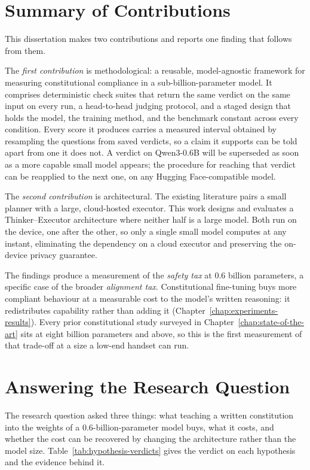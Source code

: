 \section{Summary of Contributions}
\label{sec:conclusion-contributions}

This dissertation makes two contributions and reports one finding that follows from them.

The \emph{first contribution} is methodological: a reusable, model-agnostic framework for measuring constitutional compliance in a sub-billion-parameter model. It comprises deterministic check suites that return the same verdict on the same input on every run, a head-to-head judging protocol, and a staged design that holds the model, the training method, and the benchmark constant across every condition. Every score it produces carries a measured interval obtained by resampling the questions from saved verdicts, so a claim it supports can be told apart from one it does not. A verdict on Qwen3-0.6B will be superseded as soon as a more capable small model appears; the procedure for reaching that verdict can be reapplied to the next one, on any Hugging Face-compatible model.

The \emph{second contribution} is architectural. The existing literature pairs a small planner with a large, cloud-hosted executor. This work designs and evaluates a Thinker--Executor architecture where neither half is a large model. Both run on the device, one after the other, so only a single small model computes at any instant, eliminating the dependency on a cloud executor and preserving the on-device privacy guarantee.

The findings produce a measurement of the \emph{safety tax} at 0.6 billion parameters, a specific case of the broader \emph{alignment tax}. Constitutional fine-tuning buys more compliant behaviour at a measurable cost to the model's written reasoning: it redistributes capability rather than adding it (Chapter~\ref{chap:experiments-results}). Every prior constitutional study surveyed in Chapter~\ref{chap:state-of-the-art} sits at eight billion parameters and above, so this is the first measurement of that trade-off at a size a low-end handset can run.

\section{Answering the Research Question}
\label{sec:conclusion-answer}

The research question asked three things: what teaching a written constitution into the weights of a 0.6-billion-parameter model buys, what it costs, and whether the cost can be recovered by changing the architecture rather than the model size. Table~\ref{tab:hypothesis-verdicts} gives the verdict on each hypothesis and the evidence behind it.

